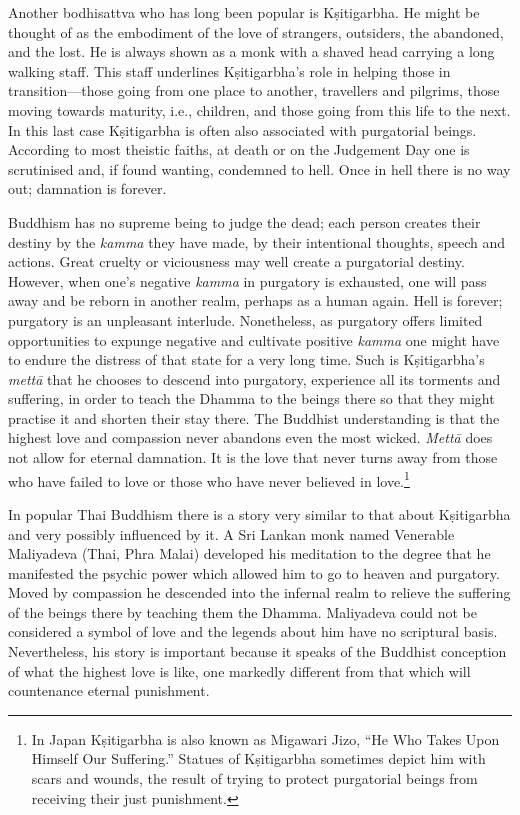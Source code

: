 \documentclass[10pt, openright]{book}
\begin{document}
Another bodhisattva who has long been popular is Kṣitigarbha. He might be thought of as the embodiment of the love of strangers, outsiders, the abandoned, and the lost. He is always shown as a monk with a shaved head carrying a long walking staff. This staff underlines Kṣitigarbha’s role in helping those in transition—those going from one place to another, travellers and pilgrims, those moving towards maturity, i.e., children, and those going from this life to the next. In this last case Kṣitigarbha is often also associated with purgatorial beings. According to most theistic faiths, at death or on the Judgement Day one is scrutinised and, if found wanting, condemned to hell. Once in hell there is no way out; damnation is forever.


Buddhism has no supreme being to judge the dead; each person creates their destiny by the \textit{kamma} they have made, by their intentional thoughts, speech and actions. Great cruelty or viciousness may well create a purgatorial destiny. However, when one’s negative \textit{kamma} in purgatory is exhausted, one will pass away and be reborn in another realm, perhaps as a human again. Hell is forever; purgatory is an unpleasant interlude. Nonetheless, as purgatory offers limited opportunities to expunge negative and cultivate positive \textit{kamma} one might have to endure the distress of that state for a very long time. Such is Kṣitigarbha’s \textit{mettā} that he chooses to descend into purgatory, experience all its torments and suffering, in order to teach the Dhamma to the beings there so that they might practise it and shorten their stay there. The Buddhist understanding is that the highest love and compassion never abandons even the most wicked. \textit{Mettā} does not allow for eternal damnation. It is the love that never turns away from those who have failed to love or those who have never believed in love.\footnote {In Japan Kṣitigarbha is also known as Migawari Jizo, “He Who Takes Upon Himself Our Suffering.” Statues of Kṣitigarbha sometimes depict him with scars and wounds, the result of trying to protect purgatorial beings from receiving their just punishment.}


In popular Thai Buddhism there is a story very similar to that about Kṣitigarbha and very possibly influenced by it. A Sri Lankan monk named Venerable Maliyadeva (Thai, Phra Malai) developed his meditation to the degree that he manifested the psychic power which allowed him to go to heaven and purgatory. Moved by compassion he descended into the infernal realm to relieve the suffering of the beings there by teaching them the Dhamma. Maliyadeva could not be considered a symbol of love and the legends about him have no scriptural basis. Nevertheless, his story is important because it speaks of the Buddhist conception of what the highest love is like, one markedly different from that which will countenance eternal punishment.
\end{document}
